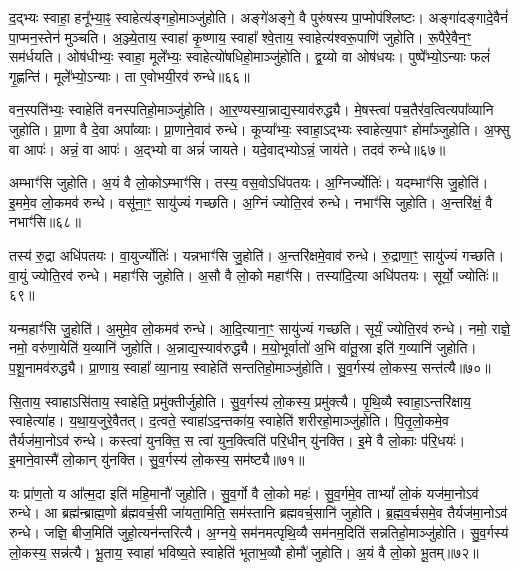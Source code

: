 द॒द्भ्यः स्वाहा॒ हनू᳚भ्या॒ꣴ॒ स्वाहेत्य॑ङ्गहो॒माञ्जु॑होति।
अङ्गे॑अङ्गे॒ वै पुरु॑षस्य पा॒प्मोप॑श्लिष्टः।
अङ्गा॑दङ्गादे॒वैनं॑ पा॒प्मन॒स्तेन॑ मुञ्चति।
अ॒ञ्ज्ये॒ताय॒ स्वाहा॑ कृ॒ष्णाय॒ स्वाहा᳚ श्वे॒ताय॒ स्वाहेत्य॑श्वरू॒पाणि॑ जुहोति।
रू॒पैरे॒वैन॒ꣳ॒ सम॑र्धयति।
ओष॑धीभ्यः॒ स्वाहा॒ मूले᳚भ्यः॒ स्वाहेत्यो॑षधिहो॒माञ्जु॑होति।
द्व॒य्यो वा ओष॑धयः।
पुष्पे᳚भ्यो॒\-ऽन्याः फलं॑ गृ॒ह्णन्ति॑।
मूले᳚भ्यो॒\-ऽन्याः।
ता ए॒वोभयी॒रव॑ रुन्धे॥६६॥\ip

वन॒स्पति॑भ्यः॒ स्वाहेति॑ वनस्पतिहो॒माञ्जु॑होति।
आ॒र॒ण्यस्या॒\-न्नाद्य॒स्या\-व॑\-रुद्ध्यै।
मे॒षस्त्वा॑ पच॒तैर॑व॒त्वित्यपा᳚व्यानि जुहोति।
प्रा॒णा वै दे॒वा अपा᳚व्याः।
प्रा॒णाने॒वाव॑ रुन्धे।
कूप्या᳚भ्यः॒ स्वाहा॒ऽद्भ्यः स्वाहेत्य॒पाꣳ होमा᳚ञ्जुहोति।
अ॒फ्सु वा आपः॑।
अन्नं॒ वा आपः॑।
अ॒द्भ्यो वा अन्नं॑ जायते।
यदे॒वाद्भ्यो\-ऽन्नं॒ जाय॑ते।
तदव॑ रुन्धे॥६७॥\ip\anuvakamend[पू॒र्व॒दी॒क्षा जु॑होति॒ पूर्व॑ ए॒व द्वि॒षन्तं॒ भ्रातृ॑व्य॒मति॑ क्राम॒त्यन॑न्तरित्यै क्रामति रुन्धे॒ जाय॑त॒ एकं॑ च]

अम्भाꣳ॑सि जुहोति।
अ॒यं वै लो॒को\-ऽम्भाꣳ॑सि।
तस्य॒ वस॒वो\-ऽधि॑पतयः।
अ॒ग्निर्ज्योतिः॑।
यदम्भाꣳ॑सि जु॒होति॑।
इ॒ममे॒व लो॒कमव॑ रुन्धे।
वसू॑ना॒ꣳ॒ सायु॑ज्यं गच्छति।
अ॒ग्निं ज्योति॒रव॑ रुन्धे।
नभाꣳ॑सि जुहोति।
अ॒न्तरि॑क्षं॒ वै नभाꣳ॑सि॥६८॥\ip

तस्य॑ रु॒द्रा अधि॑पतयः।
वा॒युर्ज्योतिः॑।
यन्नभाꣳ॑सि जु॒होति॑।
अ॒न्तरि॑क्षमे॒वाव॑ रुन्धे।
रु॒द्राणा॒ꣳ॒ सायु॑ज्यं गच्छति।
वा॒युं ज्योति॒रव॑ रुन्धे।
महाꣳ॑सि जुहोति।
अ॒सौ वै लो॒को महाꣳ॑सि।
तस्या॑दि॒त्या अधि॑पतयः।
सूर्यो॒ ज्योतिः॑॥६९॥\ip

यन्महाꣳ॑सि जु॒होति॑।
अ॒मुमे॒व लो॒कमव॑ रुन्धे।
आ॒दि॒त्याना॒ꣳ॒ सायु॑ज्यं गच्छति।
सूर्यं॒ ज्योति॒रव॑ रुन्धे।
नमो॒ राज्ञे॒ नमो॒ वरु॑णा॒येति॑ य॒व्यानि॑ जुहोति।
अ॒न्नाद्य॒स्या\-व॑\-रुद्ध्यै।
म॒यो॒भूर्वातो॑ अ॒भि वा॑तू॒स्रा इति॑ ग॒व्यानि॑ जुहोति।
प॒शू॒नामव॑रुद्ध्यै।
प्रा॒णाय॒ स्वाहा᳚ व्या॒नाय॒ स्वाहेति॑ सन्ततिहो॒माञ्जु॑होति।
सु॒व॒र्गस्य॑ लो॒कस्य॒ सन्त॑त्यै॥७०॥\ip

सि॒ताय॒ स्वाहा\-ऽसि॑ताय॒ स्वाहेति॒ प्रमु॑क्तीर्जुहोति।
सु॒व॒र्गस्य॑ लो॒कस्य॒ प्रमु॑क्त्यै।
पृ॒थि॒व्यै स्वाहा॒\-ऽन्तरि॑क्षाय॒ स्वाहेत्या॑ह।
य॒था॒\-य॒जु\-रे॒वै\-तत्।
द॒त्वते॒ स्वाहा॑\-ऽद॒न्तका॑य॒ स्वाहेति॑ शरीरहो॒माञ्जु॑होति।
पि॒तृ॒लो॒कमे॒व तैर्यज॑मा॒नोऽव॑ रुन्धे।
कस्त्वा॑ युनक्ति॒ स त्वा॑ युन॒क्त्विति॑ परि॒धीन् यु॑नक्ति।
इ॒मे वै लो॒काः प॑रि॒धयः॑।
इ॒माने॒वास्मै॑ लो॒कान् यु॑नक्ति।
सु॒व॒र्गस्य॑ लो॒कस्य॒ सम॑ष्ट्यै॥७१॥\ip

यः प्रा॑ण॒तो य आ᳚त्म॒दा इति॑ महि॒मानौ॑ जुहोति।
सु॒व॒र्गो वै लो॒को महः॑।
सु॒व॒र्गमे॒व ताभ्यां᳚ लो॒कं यज॑मा॒नोऽव॑ रुन्धे।
आ ब्रह्म॑न्ब्राह्म॒णो ब्र॑ह्म\-वर्च॒सी जा॑यता॒मिति॒ सम॑स्तानि ब्रह्मवर्च॒सानि॑ जुहोति।
ब्र॒ह्म॒व॒र्चसमे॒व तैर्यज॑मा॒नोऽव॑ रुन्धे।
जज्ञि॒ बीज॒मिति॑ जुहो॒त्यन॑न्तरित्यै।
अ॒ग्नये॒ सम॑नमत्पृथि॒व्यै सम॑नम॒दिति॑ सन्नतिहो॒माञ्जु॑होति।
सु॒व॒र्गस्य॑ लो॒कस्य॒ सन्न॑त्यै।
भू॒ताय॒ स्वाहा॑ भविष्य॒ते स्वाहेति॑ भूताभ॒व्यौ होमौ॑ जुहोति।
अ॒यं वै लो॒को भू॒तम्॥७२॥\ip

